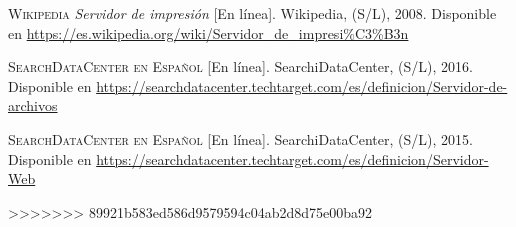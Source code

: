 \begin{thebibliography}{X}
		\textsc{Wikipedia}
		\textit{Servidor de impresión} [En línea].
		Wikipedia, (S/L), 2008.
		\newline
		Disponible en
		\url{https://es.wikipedia.org/wiki/Servidor_de_impresi\%C3\%B3n}

		\textsc{SearchDataCenter en Español} [En línea].
		SearchiDataCenter, (S/L), 2016.
		\newline
		Disponible en
		\url{https://searchdatacenter.techtarget.com/es/definicion/Servidor-de-archivos}

		\textsc{SearchDataCenter en Español} [En línea].
		SearchiDataCenter, (S/L), 2015.
		\newline
		Disponible en
		\url{https://searchdatacenter.techtarget.com/es/definicion/Servidor-Web}

>>>>>>> 89921b583ed586d9579594c04ab2d8d75e00ba92
\end{thebibliography}

